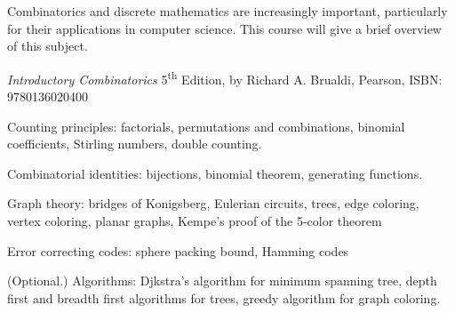 \documentclass{osucourse}
\begin{document}
\CatalogDescription
\PrerequisitesAndExclusions

\begin{Purpose}
Combinatorics and discrete mathematics are increasingly important,
particularly for their applications in computer science. This course
will give a brief overview of this subject.
\end{Purpose}

\begin{Text}
\emph{Introductory Combinatorics} 5\textsuperscript{th} Edition, by
Richard A. Brualdi, Pearson, ISBN: 9780136020400
\end{Text}

\begin{TopicsList}
\item
  Counting principles: factorials, permutations and combinations,
  binomial coefficients, Stirling numbers, double counting.
\item
  Combinatorial identities: bijections, binomial theorem, generating
  functions.
\item
  Graph theory: bridges of Konigsberg, Eulerian circuits, trees, edge
  coloring, vertex coloring, planar graphs, Kempe's proof of the 5-color
  theorem
\item
  Error correcting codes: sphere packing bound, Hamming codes
\item
  (Optional.) Algorithms: Djkstra's algorithm for minimum spanning tree,
  depth first and breadth first algorithms for trees, greedy algorithm
  for graph coloring.
\end{TopicsList}

\begin{SuggestedSchedule}
\end{SuggestedSchedule}
\end{document}
